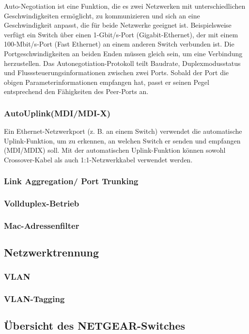         Auto-Negotiation ist eine Funktion, die es zwei Netzwerken mit unterschiedlichen Geschwindigkeiten
        ermöglicht, zu kommunizieren und sich an eine Geschwindigkeit anpasst, 
        die für beide Netzwerke geeignet ist. 
        Beispielsweise verfügt ein Switch über einen 1-Gbit/s-Port (Gigabit-Ethernet), 
        der mit einem 100-Mbit/s-Port (Fast Ethernet) an einem anderen Switch verbunden ist. 
        Die Portgeschwindigkeiten an beiden Enden müssen gleich sein, um eine Verbindung herzustellen. 
        Das Autonegotiation-Protokoll teilt Baudrate, Duplexmodusstatus und Flusssteuerungsinformationen zwischen zwei Ports. 
        Sobald der Port die obigen Parameterinformationen empfangen hat, 
        passt er seinen Pegel entsprechend den Fähigkeiten des Peer-Ports an.

        \subsubsection{AutoUplink(MDI/MDI-X)}

        Ein Ethernet-Netzwerkport (z. B. an einem Switch) verwendet die automatische Uplink-Funktion, um zu erkennen, 
        an welchen Switch er senden und empfangen (MDI/MDIX) soll. 
        Mit der automatischen Uplink-Funktion können sowohl Crossover-Kabel 
        als auch 1:1-Netzwerkkabel verwendet werden.

        \newpage
        \subsubsection{Link Aggregation/ Port Trunking}

        \newpage
        \subsubsection{Vollduplex-Betrieb}

        \newpage
        \subsubsection{Mac-Adressenfilter}

    \newpage
    \subsection{Netzwerktrennung}

        \subsubsection{VLAN}

        \newpage
        \subsubsection{VLAN-Tagging}

    \newpage
    \subsection{Übersicht des NETGEAR-Switches}